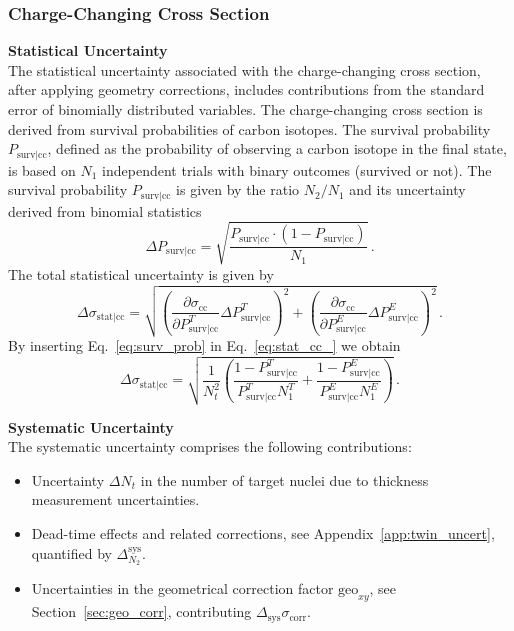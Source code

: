 \subsubsection{Charge-Changing Cross Section}

\textbf{Statistical Uncertainty} \\
The statistical uncertainty associated with the charge-changing cross section, after applying geometry corrections, includes contributions from the standard error of binomially distributed variables.
The charge-changing cross section is derived from survival probabilities of carbon isotopes.
The survival probability $P_{\text{surv}|\text{cc}}$, defined as the probability of observing a carbon isotope in the final state, is based on $N_1$ independent trials with binary outcomes (survived or not). The survival probability $P_{\text{surv}|\text{cc}}$ is given by the ratio $N_2 / N_1$ and its uncertainty derived from binomial statistics
\begin{equation}\label{eq:surv_prob}
\Delta P_{\text{surv}|\text{cc}} = \sqrt{ \frac{P_{\text{surv}|\text{cc}} \cdot \left(1 - P_{\text{surv}|\text{cc}}\right)}{N_1} } \, .
\end{equation}
The total statistical uncertainty is given by
\begin{equation}
\label{eq:stat_cc_}
\Delta\sigma_{\text{stat}|\text{cc}} = \sqrt{\left(\frac{\partial \sigma_{\text{cc}}}{\partial P^{T}_{\text{surv}|\text{cc}}} \Delta P^{T}_{\text{surv}|\text{cc}}\right)^2 + \left(\frac{\partial \sigma_{\text{cc}}}{\partial P^{E}_{\text{surv}|\text{cc}}} \Delta P^{E}_{\text{surv}|\text{cc}}\right)^2} \, .
\end{equation}
By inserting Eq.~\ref{eq:surv_prob} in Eq.~\ref{eq:stat_cc_} we obtain
\begin{equation}
\Delta\sigma_{\text{stat}|\text{cc}} = \sqrt{ \frac{1}{N_t^2} \left( \frac{1 - P^{T}_{\text{surv}|\text{cc}}}{P^{T}_{\text{surv}|\text{cc}} N^{T}_1} + \frac{1 - P^{E}_{\text{surv}|\text{cc}}}{P^{E}_{\text{surv}|\text{cc}} N^{E}_1} \right) } \, .
\end{equation}


\textbf{Systematic Uncertainty} \\
The systematic uncertainty comprises the following contributions:
\begin{itemize}
  \item Uncertainty $\Delta N_t$ in the number of target nuclei due to thickness measurement uncertainties.
  \item Dead-time effects and related corrections, see Appendix~\ref{app:twin_uncert}, quantified by $\Delta^{\text{sys}}_{N_2}$.
  \item Uncertainties in the geometrical correction factor $\text{geo}_{xy}$, see Section~\ref{sec:geo_corr}, contributing $\Delta_{\text{sys}}\sigma_{\text{corr}}$.
\end{itemize}

